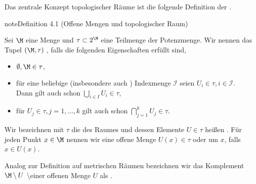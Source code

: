 \documentclass[letterpaper,10pt,german]{jupyterBook}
\begin{document}
\sphinxAtStartPar
Das zentrale Konzept topologischer Räume ist die folgende Definition der .
\label{manifolds/manifolds_prelim:definition-0}
\begin{sphinxadmonition}{note}{Definition 4.1 (Offene Mengen und topologischer Raum)}



\sphinxAtStartPar
Sei \(\M\) eine Menge und \(\tau \subset 2^\M\) eine Teilmenge der Potenzmenge.
Wir nennen das Tupel \((\M,\tau)\) , falls die folgenden Eigenschaften erfüllt sind,
\begin{itemize}
\item {} 
\sphinxAtStartPar
\(\emptyset, \M \in \tau\),

\item {} 
\sphinxAtStartPar
für eine beliebige (insbesondere auch ) Indexmenge \(\mathcal{I}\) seien \(U_i\in\tau, i\in \mathcal{I}\). Dann gilt auch schon \(\bigcup_{i\in I} U_i \in \tau\),

\item {} 
\sphinxAtStartPar
für  \(U_j\in\tau, j=1,\ldots, k\) gilt auch schon \(\bigcap_{j=1}^k U_j \in \tau\).

\end{itemize}

\sphinxAtStartPar
Wir bezeichnen mit \(\tau\) die  des Raumes und dessen Elemente \(U\in\tau\) heißen .
Für jeden Punkt \(x\in \M\) nennen wir eine offene Menge \(U(x) \in \tau\)  oder  um \(x\), falls \(x\in U(x)\).

\sphinxAtStartPar
Analog zur Definition auf metrischen Räumen bezeichnen wir das Komplement \(\M \setminus U\) \textbackslash{}einer offenen Menge \(U\) als .
\end{sphinxadmonition}
\end{document}
